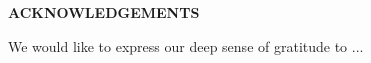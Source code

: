 \begin{center}
	\LARGE \textbf{ACKNOWLEDGEMENTS}
\end{center}

\vspace{1cm}

\noindent We would like to express our deep sense of gratitude to ... 

\vspace{1cm}

\noindent \textbf{\tplStudentA} \\
\noindent \textbf{\tplStudentB} \\
\noindent \textbf{\tplStudentC} \\
\noindent \textbf{\tplStudentD} \\
